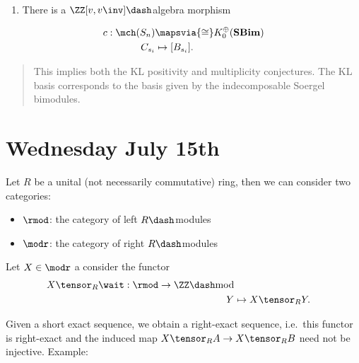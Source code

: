 \begin{description}
\begin{enumerate}
\def\labelenumi{\arabic{enumi}.}
\setcounter{enumi}{2}
\tightlist
\item
  There is a \(\ZZ[v, v\inv]\dash\)algebra morphism
\end{enumerate}

\begin{align*}
c: \mch(S_n) &\mapsvia{\cong} K_0^\oplus(\mathbf{SBim}) \\
C_{s_i} &\mapsto [B_{s_i}]
.\end{align*}

\begin{quote}
This implies both the KL positivity and multiplicity conjectures. The KL
basis corresponds to the basis given by the indecomposable Soergel
bimodules.
\end{quote}
\end{description}

\hypertarget{wednesday-july-15th}{%
\section{Wednesday July 15th}\label{wednesday-july-15th}}

Let \(R\) be a unital (not necessarily commutative) ring, then we can
consider two categories:

\begin{itemize}
\tightlist
\item
  \(\rmod\): the category of left \(R\dash\)modules
\item
  \(\modr\): the category of right \(R\dash\)modules
\end{itemize}

Let \(X\in \modr\) a consider the functor \begin{align*}
X\tensor_R \wait: \rmod \to \ZZ\dash\text{mod} \\
Y &\mapsto X\tensor_R Y
.\end{align*}

Given a short exact sequence, we obtain a right-exact sequence,
i.e.~this functor is right-exact and the induced map
\(X\tensor_R A \to X\tensor_R B\) need not be injective. Example:

\begin{center}
\end{center}

